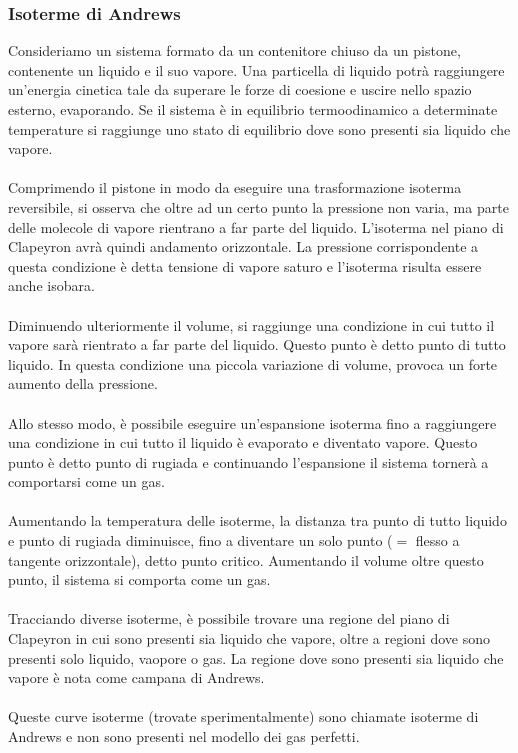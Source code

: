 \documentclass{article}
\begin{document}
\subsubsection{Isoterme di Andrews}
Consideriamo un sistema formato da un contenitore chiuso da un pistone, contenente un liquido e il suo vapore. Una particella di liquido potrà raggiungere un'energia cinetica tale da superare le forze di coesione e uscire nello spazio esterno, evaporando. Se il sistema è in equilibrio termoodinamico a determinate temperature si raggiunge uno stato di equilibrio dove sono presenti sia liquido che vapore.\\\\
Comprimendo il pistone in modo da eseguire una trasformazione isoterma reversibile, si osserva che oltre ad un certo punto la pressione non varia, ma parte delle molecole di vapore rientrano a far parte del liquido. L'isoterma nel piano di Clapeyron avrà quindi andamento orizzontale. La pressione corrispondente a questa condizione è detta tensione di vapore saturo e l'isoterma risulta essere anche isobara.\\\\
Diminuendo ulteriormente il volume, si raggiunge una condizione in cui tutto il vapore sarà rientrato a far parte del liquido. Questo punto è detto punto di tutto liquido. In questa condizione una piccola variazione di volume, provoca un forte aumento della pressione.\\\\
Allo stesso modo, è possibile eseguire un'espansione isoterma fino a raggiungere una condizione in cui tutto il liquido è evaporato e diventato vapore. Questo punto è detto punto di rugiada e continuando l'espansione il sistema tornerà a comportarsi come un gas.\\\\
Aumentando la temperatura delle isoterme, la distanza tra punto di tutto liquido e punto di rugiada diminuisce, fino a diventare un solo punto ($=$ flesso a tangente orizzontale), detto punto critico. Aumentando il volume oltre questo punto, il sistema si comporta come un gas.\\\\
Tracciando diverse isoterme, è possibile trovare una regione del piano di Clapeyron in cui sono presenti sia liquido che vapore, oltre a regioni dove sono presenti solo liquido, vaopore o gas. La regione dove sono presenti sia liquido che vapore è nota come campana di Andrews.\\\\
Queste curve isoterme (trovate sperimentalmente) sono chiamate isoterme di Andrews e non sono presenti nel modello dei gas perfetti.
\end{document}
